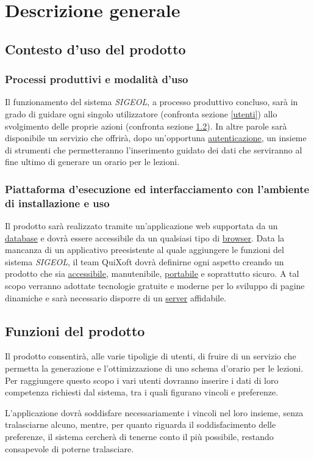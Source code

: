\documentclass[11pt,a4paper]{article}
\begin{document}
\section{Descrizione generale}
\subsection{Contesto d'uso del prodotto}
\subsubsection{Processi produttivi e modalità d'uso}
Il funzionamento del sistema \textit{SIGEOL}, a processo produttivo concluso, sarà in grado di guidare ogni singolo utilizzatore (confronta sezione \ref{utenti}) allo svolgimento delle proprie azioni (confronta sezione \ref{funzioni}). In altre parole sarà disponibile un servizio che offrirà, dopo un'opportuna \underline{autenticazione}, un insieme di strumenti che permetteranno l'inserimento guidato dei dati che serviranno al fine ultimo di generare un orario per le lezioni.
\subsubsection{Piattaforma d’esecuzione ed interfacciamento con l’ambiente di installazione e uso}
Il prodotto sarà realizzato tramite un'applicazione web supportata da un \underline{database} e dovrà essere accessibile da un qualsiasi tipo di \underline{browser}. Data la mancanza di un applicativo preesistente al quale aggiungere le funzioni del sistema \textit{SIGEOL}, il team QuiXoft dovrà definirne ogni aspetto creando un prodotto che sia \underline{accessibile}, manutenibile, \underline{portabile} e soprattutto sicuro. A tal scopo verranno adottate tecnologie gratuite e moderne per lo sviluppo di pagine dinamiche e sarà necessario disporre di un \underline{server} affidabile.
\subsection{Funzioni del prodotto} \label{funzioni}
Il prodotto consentirà, alle varie tipoligie di utenti, di fruire di un servizio che permetta la generazione e l'ottimizzazione di uno schema d'orario per le lezioni. Per raggiungere questo scopo i vari utenti dovranno inserire i dati di loro competenza richiesti dal sistema, tra i quali figurano vincoli e preferenze.

L'applicazione dovrà soddisfare necessariamente i vincoli nel loro insieme, senza tralasciarne alcuno, mentre, per quanto riguarda il soddisfacimento delle preferenze, il sistema cercherà di tenerne conto il più possibile, restando consapevole di poterne tralasciare.
\end{document}
